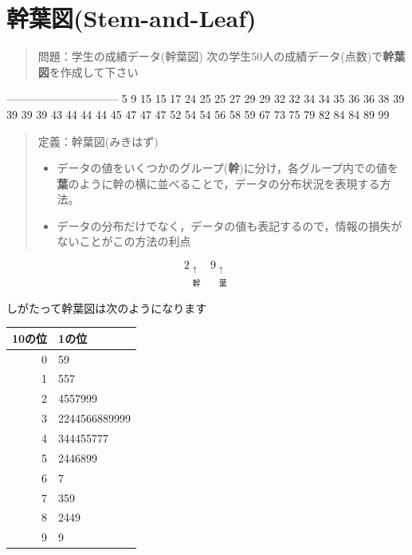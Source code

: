 \documentclass[
]{book}
\providecommand{\tightlist}{%
  \setlength{\itemsep}{0pt}\setlength{\parskip}{0pt}}
\theoremstyle{definition}
\theoremstyle{definition}
\theoremstyle{definition}
\theoremstyle{definition}
\theoremstyle{remark}
\begin{document}
\hypertarget{ux5e79ux8449ux56f3stem-and-leaf}{%
\section{幹葉図(Stem-and-Leaf)}\label{ux5e79ux8449ux56f3stem-and-leaf}}

\begin{quote}
問題：学生の成績データ(幹葉図)
次の学生50人の成績データ(点数)で\textbf{幹葉図}を作成して下さい
\end{quote}

\textbar---\textbar---\textbar---\textbar---\textbar---\textbar---\textbar---\textbar---\textbar---\textbar---\textbar{}
\textbar{} 5 \textbar{} 9 \textbar{} 15 \textbar{} 15 \textbar{} 17 \textbar{} 24 \textbar{} 25 \textbar{} 25 \textbar{} 27 \textbar{} 29 \textbar{}
 \textbar{} 29 \textbar{} 32 \textbar{} 32 \textbar{} 34 \textbar{} 34 \textbar{} 35 \textbar{} 36 \textbar{} 36 \textbar{} 38 \textbar{}
 \textbar{} 39 \textbar{} 39 \textbar{} 39 \textbar{} 39 \textbar{} 43 \textbar{} 44 \textbar{} 44 \textbar{} 44 \textbar{} 45 \textbar{}
 \textbar{} 47 \textbar{} 47 \textbar{} 47 \textbar{} 52 \textbar{} 54 \textbar{} 54 \textbar{} 56 \textbar{} 58 \textbar{} 59 \textbar{}
 \textbar{} 67 \textbar{} 73 \textbar{} 75 \textbar{} 79 \textbar{} 82 \textbar{} 84 \textbar{} 84 \textbar{} 89 \textbar{} 99 \textbar{}

\begin{quote}
定義：幹葉図(みきはず)

\begin{itemize}
\tightlist
\item
  データの値をいくつかのグループ(\textbf{幹})に分け，各グループ内での値を\textbf{葉}のように幹の横に並べることで，データの分布状況を表現する方法。
\item
  データの分布だけでなく，データの値も表記するので，情報の損失がないことがこの方法の利点
\end{itemize}
\end{quote}

\[
\mathop{2}_{\substack{\uparrow \\ \text{幹}}}
\mathop{9}_{\substack{\uparrow \\ \text{葉}}}
\]

しがたって幹葉図は次のようになります

\begin{longtable}[]{@{}rl@{}}
\toprule()
10の位 & 1の位 \\
\midrule()
\endhead
0 & 59 \\
1 & 557 \\
2 & 4557999 \\
3 & 2244566889999 \\
4 & 344455777 \\
5 & 2446899 \\
6 & 7 \\
7 & 359 \\
8 & 2449 \\
9 & 9 \\
\bottomrule()
\end{longtable}
\end{document}
